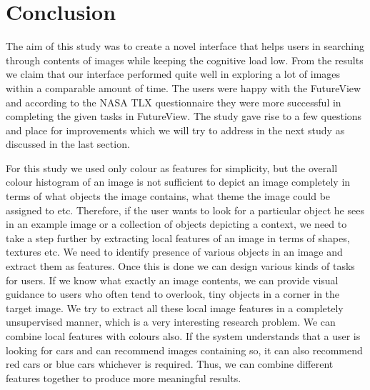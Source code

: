 \documentclass[english]{tktltiki}
\begin{document}
\section{Conclusion}

The aim of this study was to create a novel interface that helps users in searching through contents of images while keeping the cognitive load low. From the results we claim that our interface performed quite well in exploring a lot of images within a comparable amount of time. The users were happy with the FutureView and according to the NASA TLX questionnaire they were more successful in completing the given tasks in FutureView. The study gave rise to a few questions and place for improvements which we will try to address in the next study as discussed in the last section.

For this study we used only colour as features for simplicity, but the overall colour histogram of an image is not sufficient to depict an image completely in terms of what objects the image contains, what theme the image could be assigned to etc. Therefore, if the user wants to look for a particular object he sees in an example image or a collection of objects depicting a context, we need to take a step further by extracting local features of an image in terms of shapes, textures etc. We need to identify presence of various objects in an image and extract them as features. Once this is done we can design various kinds of tasks for users. If we know what exactly an image contents, we can provide visual guidance to users who often tend to overlook, tiny objects in a corner in the target image. We try to extract all these local image features in a completely unsupervised manner, which is a very interesting research problem. We can combine local features with colours also. If the system understands that a user is looking for cars and can recommend images containing so, it can also recommend red cars or blue cars whichever is required. Thus, we can combine different features together to produce more meaningful results.


\end{document}
